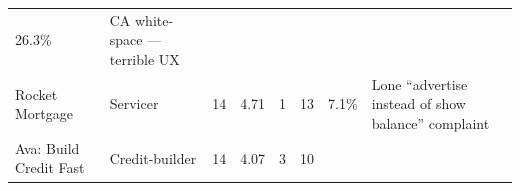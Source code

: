 \documentclass[
  10pt,
]{article}
\begin{document}
\begin{longtable}[]{@{}llllllll@{}}
\begin{minipage}[t]{0.10\columnwidth}
26.3\%\strut
\end{minipage} & \begin{minipage}[t]{0.10\columnwidth}\raggedright
CA white-space --- terrible UX\strut
\end{minipage}\tabularnewline
\begin{minipage}[t]{0.10\columnwidth}\raggedright
Rocket Mortgage\strut
\end{minipage} & \begin{minipage}[t]{0.10\columnwidth}\raggedright
Servicer\strut
\end{minipage} & \begin{minipage}[t]{0.10\columnwidth}\raggedright
14\strut
\end{minipage} & \begin{minipage}[t]{0.10\columnwidth}\raggedright
4.71\strut
\end{minipage} & \begin{minipage}[t]{0.10\columnwidth}\raggedright
1\strut
\end{minipage} & \begin{minipage}[t]{0.10\columnwidth}\raggedright
13\strut
\end{minipage} & \begin{minipage}[t]{0.10\columnwidth}\raggedright
7.1\%\strut
\end{minipage} & \begin{minipage}[t]{0.10\columnwidth}\raggedright
Lone ``advertise instead of show balance'' complaint\strut
\end{minipage}\tabularnewline
\begin{minipage}[t]{0.10\columnwidth}\raggedright
Ava: Build Credit Fast\strut
\end{minipage} & \begin{minipage}[t]{0.10\columnwidth}\raggedright
Credit-builder\strut
\end{minipage} & \begin{minipage}[t]{0.10\columnwidth}\raggedright
14\strut
\end{minipage} & \begin{minipage}[t]{0.10\columnwidth}\raggedright
4.07\strut
\end{minipage} & \begin{minipage}[t]{0.10\columnwidth}\raggedright
3\strut
\end{minipage} & \begin{minipage}[t]{0.10\columnwidth}\raggedright
10\strut
\end{minipage} & \begin{minipage}[t]{0.10\columnwidth}\raggedright

\end{minipage}
\end{longtable}
\end{document}
